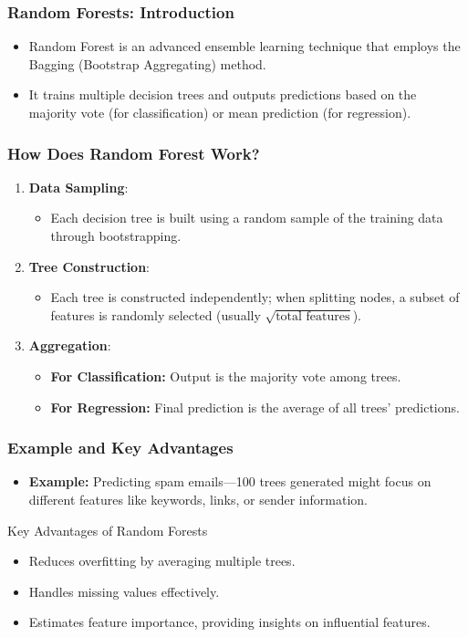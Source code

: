 \documentclass[aspectratio=169]{beamer}
\begin{document}
\begin{frame}[fragile]
  \frametitle{Random Forests: Introduction}
  \begin{itemize}
    \item Random Forest is an advanced ensemble learning technique that employs the Bagging (Bootstrap Aggregating) method.
    \item It trains multiple decision trees and outputs predictions based on the majority vote (for classification) or mean prediction (for regression).
  \end{itemize}
\end{frame}

\begin{frame}[fragile]
  \frametitle{How Does Random Forest Work?}
  \begin{enumerate}
    \item \textbf{Data Sampling}:
      \begin{itemize}
        \item Each decision tree is built using a random sample of the training data through bootstrapping.
      \end{itemize}
    
    \item \textbf{Tree Construction}:
      \begin{itemize}
        \item Each tree is constructed independently; when splitting nodes, a subset of features is randomly selected (usually $\sqrt{\text{total features}}$).
      \end{itemize}
    
    \item \textbf{Aggregation}:
      \begin{itemize}
        \item \textbf{For Classification:} Output is the majority vote among trees.
        \item \textbf{For Regression:} Final prediction is the average of all trees' predictions.
      \end{itemize}
  \end{enumerate}
\end{frame}

\begin{frame}[fragile]
  \frametitle{Example and Key Advantages}
  \begin{itemize}
    \item \textbf{Example:} Predicting spam emails—100 trees generated might focus on different features like keywords, links, or sender information.
  \end{itemize}

  \begin{block}{Key Advantages of Random Forests}
    \begin{itemize}
      \item Reduces overfitting by averaging multiple trees.
      \item Handles missing values effectively.
      \item Estimates feature importance, providing insights on influential features.
    \end{itemize}
  \end{block}
\end{frame}
\end{document}
